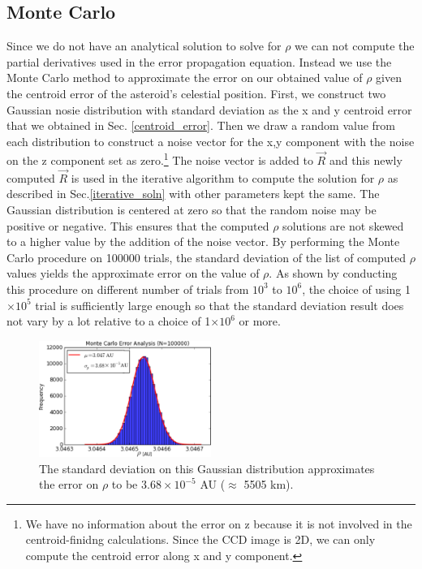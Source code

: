 \documentclass[authoryear, 12pt,5p, times]{elsarticle}
\begin{document}
\subsection{Monte Carlo}
Since we do not have an analytical solution to solve for $\rho$ we can not compute the partial derivatives used in the error propagation equation. Instead we use the Monte Carlo method to approximate the error on our obtained value of $\rho$ given the centroid error of the asteroid's celestial position. First, we construct two Gaussian nosie distribution with standard deviation as the x and y centroid error that we obtained in Sec. \ref{centroid_error}. Then we draw a random value from each distribution to construct a noise vector for the x,y component with the noise on the z component set as zero.\footnote{ We have no information about the error on z  because it is not involved in the centroid-finidng calculations. Since the CCD image is 2D, we can only compute the centroid error along x and y component.}  The noise vector is added to $\vec{R}$ and this newly computed $\vec{R}$ is used in the iterative algorithm to compute the solution for $\rho$ as described in Sec.\ref{iterative_soln} with other parameters kept the same. The Gaussian distribution is centered at zero so that the random noise may be positive or negative. This ensures that the computed $\rho$ solutions are not skewed to  a higher value by the addition of the noise vector. By performing the Monte Carlo procedure on 100000 trials, the standard deviation of the list of computed $\rho$ values yields the approximate error on the value of $\rho$. As shown by conducting this procedure on different number of trials from $10^3$ to $10^6$, the choice of using 1$\times10^5$ trial is sufficiently large enough so that the standard deviation result does not vary by a lot relative to a choice of 1$\times10^6$ or more.
    	\begin{figure}[h!]
\includegraphics[width=0.5\textwidth]{figures/monte_carlo_result}
\caption{The standard deviation on this Gaussian distribution approximates the error on $\rho$ to be $3.68\times10^{-5}$ AU ($\approx$ 5505 km).}
\label{monte_carlo_result}
\end{figure}
\end{document}
